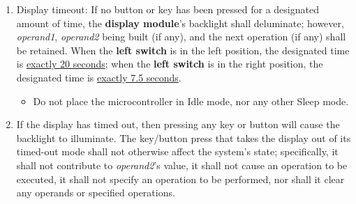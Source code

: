 \begin{enumerate}
\item Display timeout: If no button or key has been pressed for a designated
    amount of time, the \textbf{display module}'s backlight shall deluminate;
    however, \textit{operand1}, \textit{operand2} being built (if any), and the
    next operation (if any) shall be retained. When the \textbf{left switch} is
    in the left position, the designated time is \underline{exactly 20
    seconds}; when the \textbf{left switch} is in the right position, the
    designated time is \underline{exactly 7.5 seconds}.
    \begin{itemize}
    \item Do not place the microcontroller in Idle mode, nor any other Sleep
        mode.
    \end{itemize}

\item \label{spec:Wakening} If the display has timed out, then pressing any key
    or button will cause the backlight to illuminate.
    The key/button press that takes the display out of its timed-out mode shall
    not otherwise affect the system's state; specifically, it shall not
    contribute to \textit{operand2}'s value, it shall not cause an operation to
    be executed, it shall not specify an operation to be performed, nor shall
    it clear any operands or specified operations.
\end{enumerate}

